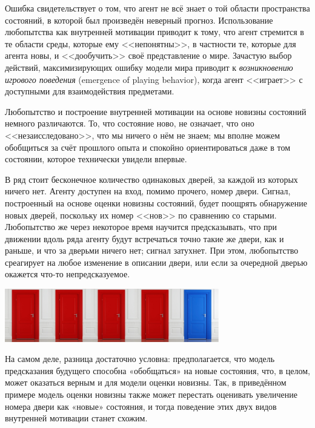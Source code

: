 Ошибка свидетельствует о том, что агент не всё знает о той области пространства состояний, в которой был произведён неверный прогноз. Использование любопытства как внутренней мотивации приводит к тому, что агент стремится в те области среды, которые ему <<непонятны>>, в частности те, которые для агента новы, и <<дообучить>> своё представление о мире. Зачастую выбор действий, максимизирующих ошибку модели мира приводит к \emph{возникновению игрового поведения} (emergence of playing behavior), когда агент <<играет>> с доступными для взаимодействия предметами.

Любопытство и построение внутренней мотивации на основе новизны состояний немного различаются. То, что состояние ново, не означает, что оно <<незаисследовано>>, что мы ничего о нём не знаем; мы вполне можем обобщиться за счёт прошлого опыта и спокойно ориентироваться даже в том состоянии, которое технически увидели впервые.

\begin{example}
В ряд стоит бесконечное количество одинаковых дверей, за каждой из которых ничего нет. Агенту доступен на вход, помимо прочего, номер двери. Сигнал, построенный на основе оценки новизны состояний, будет поощрять обнаружение новых дверей, поскольку
их номер <<нов>> по сравнению со старыми. Любопытство же через некоторое время научится предсказывать, что при движении вдоль ряда агенту будут встречаться точно такие же двери, как и раньше, и что за дверьми ничего нет; сигнал затухнет. При этом, любопытство среагирует на любое изменение в описании двери, или если за очередной дверью окажется что-то непредсказуемое.

\begin{center}
    \includegraphics[width=0.7\textwidth]{Images/doors.jpg}
\end{center}

На самом деле, разница достаточно условна: предполагается, что модель предсказания будущего способна «обобщаться» на новые состояния, что, в целом, может оказаться верным и для модели оценки новизны. Так, в приведённом примере модель оценки новизны также может перестать оценивать увеличение номера двери как «новые» состояния, и тогда поведение этих двух видов внутренней мотивации станет схожим.

\end{example}

